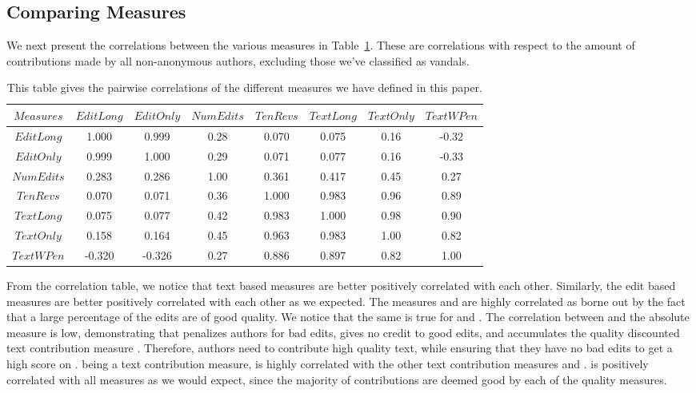 \pagebreak
\subsection{Comparing Measures}

We next present the correlations between the various measures
in Table~\ref{cor-tab}.
These are correlations with respect to the amount of contributions
made by all non-anonymous authors, excluding those we've classified
as vandals.
%
\begin{table}
\begin{center}
\begin{tabular}{|c||c|c|c|c|c|c|c|}
	\hline
$Measures$ &  $EditLong$ & $EditOnly$ & $NumEdits$ & $TenRevs$ & $TextLong$ & $TextOnly$ & $TextWPen$ \\
        \hline \hline
$EditLong$         &  1.000  & 0.999  &  0.28  &         0.070  & 0.075  &  0.16  & -0.32 \\
$EditOnly$         &  0.999  & 1.000  &  0.29  &         0.071  & 0.077  &  0.16  & -0.33 \\
$NumEdits$         &  0.283  & 0.286  &  1.00  &         0.361  & 0.417  &  0.45  &  0.27 \\
$TenRevs$          &  0.070  & 0.071  &  0.36  &         1.000  & 0.983  &  0.96  &  0.89 \\
$TextLong$         &  0.075  & 0.077  &  0.42  &         0.983  & 1.000  &  0.98  &  0.90 \\
$TextOnly$         &  0.158  & 0.164  &  0.45  &         0.963  & 0.983  &  1.00  &  0.82 \\
$TextWPen$         & -0.320  &-0.326  &  0.27  &         0.886  & 0.897  &  0.82  &  1.00 \\
        \hline
\end{tabular}
\end{center}
\caption[Correlations between author contribution measures]{
This table gives the pairwise correlations of the different measures we
have defined in this paper.
}\label{cor-tab}
\end{table}
%
From the correlation table, we notice that text based measures are
better positively correlated with each other.
Similarly, the edit based measures are better positively correlated
with each other as we expected.
The measures \editlong and \editonly are highly correlated as
borne out by the fact that a large percentage of the edits are of
good quality.
We notice that the same is true for \textlong and \textonly.
The correlation between \punish and the absolute measure
\editonly is low, demonstrating that \punish
penalizes authors for bad edits, gives no credit to good edits,
and accumulates the quality discounted text contribution measure
\textlong.
Therefore, authors need to contribute high quality text, while
ensuring that they have no bad edits to get a high score on
\punish.
\tenrevs being a text contribution measure, is highly correlated
with the other text contribution measures \textonly and
\textlong.
\numedits is positively correlated with all measures as we would
expect, since the majority of contributions are deemed good by
each of the quality measures.

